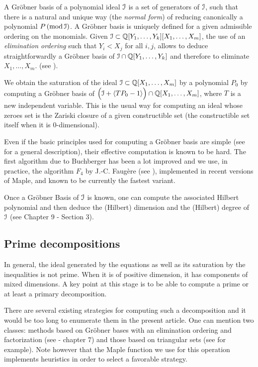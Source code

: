 \def\cI{\cal I}
A Gröbner basis of a polynomial ideal ${\cI}$
is a set of generators of  ${\cI}$, such that
there is a natural and unique way (the {\em normal form}) of reducing canonically a polynomial $P \Mod{\cI}$.
A Gröbner basis is uniquely defined for a given admissible ordering on
the monomials.
Given
$\cI \subset \Q[Y_1,\ldots,Y_k][X_{1},\ldots,X_m]$,
the use of an {\em elimination ordering}
such that $Y_i<X_j$ for all $i,j$, allows to deduce
straightforwardly a Gr\"obner basis of $\cI \cap  \Q[Y_1,\ldots,Y_k]$ and therefore to eliminate $X_1, \ldots, X_m$.
(see \cite[Ch. 3]{CLO1997}).

We obtain the saturation of the ideal $\cI \subset \Q[X_1,\ldots,X_m]$ by a polynomial $P_0$ by  computing a Gröbner
basis of $\Bigl ( \cI+\langle TP_0-1\rangle \Bigr ) \cap  \Q[X_1,\ldots,X_m]$, where $T$ is a new
independent variable. %
This is the usual way for computing an ideal whose zeroes set is the Zariski closure of a given
constructible set (the constructible set itself when it is 0-dimensional).

Even if the basic principles used for computing a Gröbner basis are simple
(see \cite{CLO1997} for a general description),
their effective computation is known to be hard.
The first algorithm due to Buchberger has been a lot
improved and we use, in practice, the algorithm $F_4$ by J.-C. Faugère (see
{\cite{Faugere1999}}), implemented in recent versions of {\sc Maple}, and
known to be currently the fastest variant.


Once a Gr\"obner Basis of ${\cI}$ is known, one can compute
the associated Hilbert polynomial and then deduce the (Hilbert) dimension and
the (Hilbert) degree of ${\cI}$ (see \cite{CLO1997} Chapter 9 - Section
3).

\subsection{Prime decompositions}
In general,
the ideal generated by the equations as well as its saturation by the inequalities is
not prime. When it is of positive dimension, it has components of mixed dimensions.
A key point at this stage is to be able to compute a prime or at least a primary
decomposition.

There are several existing strategies for computing such a
decomposition and it would be too long to enumerate them in the
present article. One can mention two classes: methods based on
Gröbner bases with an elimination ordering and factorization (see
\cite{CLO1997} - chapter 7) and those based on triangular sets (see
\cite{ALM1999} for example). Note  however that the Maple function we use for
this operation implements heuristics in order to select a favorable strategy.

